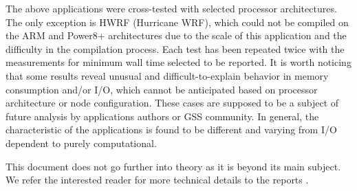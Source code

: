 The above applications were cross-tested with selected processor architectures. The only exception is HWRF (Hurricane WRF), which could not be compiled on the ARM and Power8+ architectures due to the scale of this application and the difficulty in the compilation process.
Each test has been repeated twice with the measurements for minimum wall time selected to be reported. It is worth noticing that some results reveal unusual and difficult-to-explain behavior in memory consumption and/or I/O, which cannot be anticipated based on processor architecture or node configuration. These cases are supposed to be a subject of future analysis by applications authors or GSS community.
In general, the characteristic of the applications is found to be different and varying from I/O dependent to purely computational.
\fi

This document does not go further into theory as it is beyond its main subject.
We refer the interested reader for more technical details to the reports \cite{2017:coegss_benchmark1,2018:coegss_benchmark2}.
